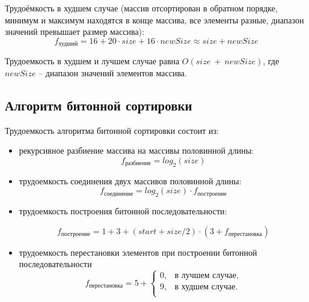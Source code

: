 Трудоёмкость в худшем случае (массив отсортирован в обратном порядке, минимум и максимум находятся в конце массива, все элементы разные, диапазон значений превышает размер массива):
\begin{equation}
	\label{worst_counting}
	f_{\text{худший}} = 16 + 20 \cdot size + 16 \cdot newSize \approx size + newSize
\end{equation}

Трудоемкость в худшем и лучшем случае равна $O(size~+~newSize)$, где $newSize$ -- диапазон значений элементов массива.

\subsection{Алгоритм битонной сортировки}

Трудоемкость алгоритма битонной сортировки состоит из:

\begin{itemize}
	\item рекурсивное разбиение массива на массивы половинной длины:
	\begin{equation}
		\label{worst_counting}
		f_{\text{разбиение}} = log_2{(size)}
	\end{equation}

	\item трудоемкость соединения двух массивов половинной длины:
	\begin{equation}
		\label{worst_counting}
		f_{\text{соединение}} = log_2{(size)} \cdot f_{\text{построение}}
	\end{equation}
	
	\item трудоемкость построения битонной последовательности:
	
	\begin{equation}
		\label{bitonic}
		f_{\text{построение}} = 1 + 3 + (start + size / 2) \cdot (3 + f_{\text{перестановка}})
	\end{equation}

	\item трудоемкость перестановки элементов при построении битонной последовательности
	\begin{equation}
		\label{bitonic}
		f_{\text{перестановка}} = 5 + \begin{cases}
			0, & \text{в лучшем случае},\\
			9, & \text{в худшем случае}.\\
		\end{cases}
	\end{equation} 	
\end{itemize}

